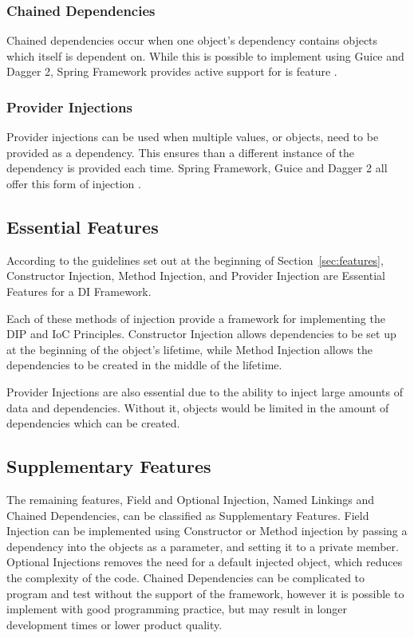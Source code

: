 \documentclass[12pt,twocolumn]{IEEEtran}
\begin{document}
\subsubsection{Chained Dependencies} %
Chained dependencies occur when one object's dependency contains objects which itself is dependent on. While this is possible to implement using Guice and Dagger 2, Spring Framework provides active support for is feature \cite{spring2019}.

\subsubsection{Provider Injections} %
Provider injections can be used when multiple values, or objects, need to be provided as a dependency. This ensures than a different instance of the dependency is provided each time. Spring Framework, Guice and Dagger 2 all offer this form of injection \cite{guicewiki2014,spring2019,dagger2019}. 

\subsection{Essential Features}
According to the guidelines set out at the beginning of Section~\ref{sec:features}, Constructor Injection, Method Injection, and Provider Injection are Essential Features for a DI Framework.

Each of these methods of injection provide a framework for implementing the DIP and IoC Principles. Constructor Injection allows dependencies to be set up at the beginning of the object's lifetime, while Method Injection allows the dependencies to be created in the middle of the lifetime. 

Provider Injections are also essential due to the ability to inject large amounts of data and dependencies. Without it, objects would be limited in the amount of dependencies which can be created. 

\subsection{Supplementary Features}

The remaining features, Field and Optional Injection, Named Linkings and Chained Dependencies, can be classified as Supplementary Features. Field Injection can be implemented using Constructor or Method injection by passing a dependency into the objects as a parameter, and setting it to a private member. Optional Injections removes the need for a default injected object, which reduces the complexity of the code. Chained Dependencies can be complicated to program and test without the support of the framework, however it is possible to implement with good programming practice, but may result in longer development times or lower product quality.
\end{document}
